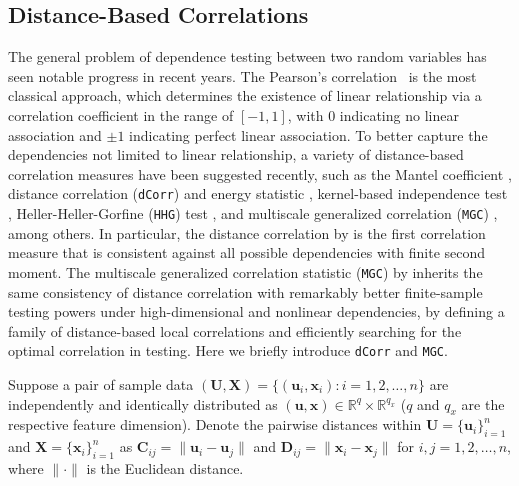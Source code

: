 \documentclass[12pt]{article}
\theoremstyle{definition}
\begin{document}
	\subsection{Distance-Based Correlations}
	\label{ssec:method1}
	
	The general problem of dependence testing between two random variables has seen notable progress in recent years. The Pearson's correlation~\citep{Pearson1895} is the most classical approach, which determines the existence of linear relationship via a correlation coefficient in the range of $[-1,1]$, with $0$ indicating no linear association and $\pm 1$ indicating perfect linear association. To better capture the dependencies not limited to linear relationship, a variety of distance-based correlation measures have been suggested recently, such as the Mantel coefficient \citep{mantel1967}, distance correlation (\texttt{dCorr}) and energy statistic \citep{szekely2007measuring,szekelyRizzo2013a, RizzoSzekely2016}, kernel-based independence test \citep{GrettonGyorfi2010}, Heller-Heller-Gorfine (\texttt{HHG}) test \citep{HellerGorfine2013,heller2016consistent}, and multiscale generalized correlation (\texttt{MGC}) \citep{shen2016discovering}, among others. In particular, the distance correlation by \cite{szekely2007measuring} is the first correlation measure that is consistent against all possible dependencies with finite second moment. The multiscale generalized correlation statistic (\texttt{MGC}) by \cite{shen2016discovering} inherits the same consistency of distance correlation with remarkably better finite-sample testing powers under high-dimensional and nonlinear dependencies, by defining a family of distance-based local correlations and efficiently searching for the optimal correlation in testing. Here we briefly introduce \texttt{dCorr} and \texttt{MGC}.
	
	Suppose a pair of sample data $(\mathbf{U}, \mathbf{X}) = \{  (\mathbf{u}_{i}, \mathbf{x}_{i} ) : i = 1,2, \ldots, n \}$ are independently and identically distributed as $(\mathbf{u},\mathbf{x}) \in \mathbb{R}^{q} \times \mathbb{R}^{q_x}$ ($q$ and $q_x$ are the respective feature dimension). Denote the pairwise distances within $\mathbf{U}=\{\mathbf{u}_{i}\}_{i=1}^{n}$ and $\mathbf{X}=\{\mathbf{x}_{i}\}_{i=1}^{n}$ as $\mathbf{C}_{ij} = \| \mathbf{u}_{i} - \mathbf{u}_{j} \|$ and $\mathbf{D}_{ij} = \| \mathbf{x}_{i} - \mathbf{x}_{j} \|$ for $i,j=1,2, \ldots , n$, where $\| \cdot \|$ is the Euclidean distance.
	
\end{document}
